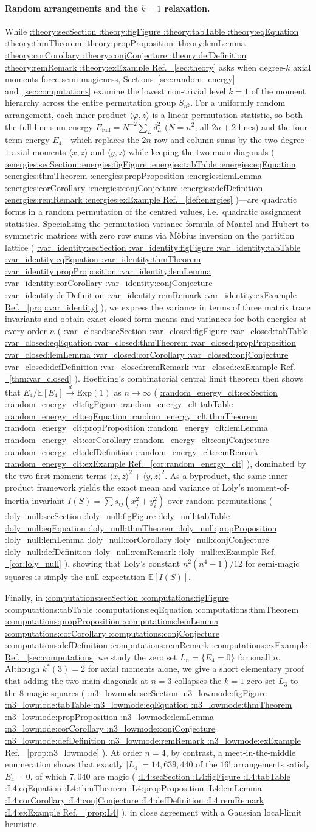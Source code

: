 \documentclass[11pt,a4paper]{article}
\makeatletter
\def\Cref@getprefix#1:#2\relax{#1}
\def\Cref@prefix@sec{sec}
\def\Cref@prefix@fig{fig}
\def\Cref@prefix@tab{tab}
\def\Cref@prefix@eq{eq}
\def\Cref@prefix@thm{thm}
\def\Cref@prefix@prop{prop}
\def\Cref@prefix@lem{lem}
\def\Cref@prefix@cor{cor}
\def\Cref@prefix@conj{conj}
\def\Cref@prefix@def{def}
\def\Cref@prefix@rem{rem}
\def\Cref@prefix@ex{ex}
\def\Cref@type@cap#1{%
  \edef\Cref@tmp{#1}%
  \ifx\Cref@tmp\Cref@prefix@sec Section%
  \else\ifx\Cref@tmp\Cref@prefix@fig Figure%
  \else\ifx\Cref@tmp\Cref@prefix@tab Table%
  \else\ifx\Cref@tmp\Cref@prefix@eq Equation%
  \else\ifx\Cref@tmp\Cref@prefix@thm Theorem%
  \else\ifx\Cref@tmp\Cref@prefix@prop Proposition%
  \else\ifx\Cref@tmp\Cref@prefix@lem Lemma%
  \else\ifx\Cref@tmp\Cref@prefix@cor Corollary%
  \else\ifx\Cref@tmp\Cref@prefix@conj Conjecture%
  \else\ifx\Cref@tmp\Cref@prefix@def Definition%
  \else\ifx\Cref@tmp\Cref@prefix@rem Remark%
  \else\ifx\Cref@tmp\Cref@prefix@ex Example%
  \else Ref.%
  \fi\fi\fi\fi\fi\fi\fi\fi\fi\fi\fi\fi
}
\DeclareRobustCommand{\Cref}[1]{%
  \begingroup
  \edef\Cref@label{#1}%
  \edef\Cref@prefix{\expandafter\Cref@getprefix\Cref@label:\relax}%
  \hyperref[#1]{\Cref@type@cap{\Cref@prefix}~\ref*{#1}}%
  \endgroup
}
\theoremstyle{plain}
\theoremstyle{definition}
\theoremstyle{remark}
\newcommand{\Efull}{E_{\mathrm{full}}}
\newcommand{\Efour}{E_4}
\newcommand{\E}{\mathbb{E}}
\makeatother
\begin{document}
\paragraph{Random arrangements and the $k=1$ relaxation.}
While \Cref{sec:theory} asks when degree-$k$ axial moments force semi-magicness, Sections~\ref{sec:random_energy} and~\ref{sec:computations} examine the lowest non-trivial level $k=1$ of the moment hierarchy across the entire permutation group $S_{n^2}$.
For a uniformly random arrangement, each inner product $\langle\varphi,z\rangle$ is a linear permutation statistic, so both the full line-sum energy $\Efull=N^{-2}\sum_L\delta_L^2$ ($N=n^2$, all $2n+2$ lines) and the four-term energy $\Efour$—which replaces the $2n$ row and column sums by the two degree-$1$ axial moments $\langle x,z\rangle$ and $\langle y,z\rangle$ while keeping the two main diagonals (\Cref{def:energies})—are quadratic forms in a random permutation of the centred values, i.e.\ quadratic assignment statistics.
Specialising the permutation variance formula of Mantel \cite{mantel1967} and Hubert \cite{hubert1987assignment} to symmetric matrices with zero row sums via M\"obius inversion on the partition lattice (\Cref{prop:var_identity}), we express the variance in terms of three matrix trace invariants and obtain exact closed-form means and variances for both energies at every order $n$ (\Cref{thm:var_closed}).
Hoeffding's combinatorial central limit theorem then shows that $\Efour/\E[\Efour]\xrightarrow{d}\mathrm{Exp}(1)$ as $n\to\infty$ (\Cref{cor:random_energy_clt}), dominated by the two first-moment terms $\langle x,z\rangle^2+\langle y,z\rangle^2$.
As a byproduct, the same inner-product framework yields the exact mean and variance of Loly's moment-of-inertia invariant $I(S)=\sum s_{ij}(x_j^2+y_i^2)$ over random permutations (\Cref{cor:loly_null}), showing that Loly's constant $n^2(n^4-1)/12$ for semi-magic squares \cite{loly2004invariance} is simply the null expectation $\E[I(S)]$.

Finally, in \Cref{sec:computations} we study the zero set $L_n = \{\Efour = 0\}$ for small $n$. Although $k^*(3)=2$ for axial moments alone, we give a short elementary proof that adding the two main diagonals at $n=3$ collapses the $k=1$ zero set $L_3$ to the $8$ magic squares (\Cref{prop:n3_lowmode}). At order $n=4$, by contrast, a meet-in-the-middle enumeration shows that exactly $|L_4|=14{,}639{,}440$ of the $16!$ arrangements satisfy $\Efour=0$, of which $7{,}040$ are magic (\Cref{prop:L4}), in close agreement with a Gaussian local-limit heuristic.
\end{document}
